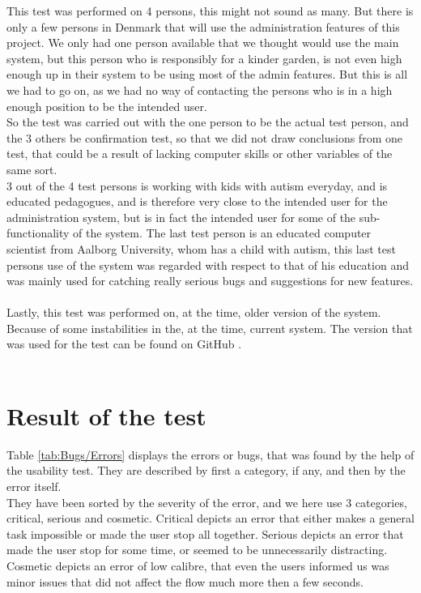 This test was performed on 4 persons, this might not sound as many. But there is only a few persons in Denmark that will use the administration features of this project. We only had one person available that we thought would use the main system, but this person who is responsibly for a kinder garden, is not even high enough up in their system to be using most of the admin features. But this is all we had to go on, as we had no way of contacting the persons who is in a high enough position to be the intended user.\\
So the test was carried out with the one person to be the actual test person, and the 3 others be confirmation test, so that we did not draw conclusions from one test, that could be a result of lacking computer skills or other variables of the same sort.\\
3 out of the 4 test persons is working with kids with autism everyday, and is educated pedagogues, and is therefore very close to the intended user for the administration system, but is in fact the intended user for some of the sub-functionality of the system. The last test person is an educated computer scientist from Aalborg University, whom has a child with autism, this last test persons use of the system was regarded with respect to that of his education and was mainly used for catching really serious bugs and suggestions for new features.\\
\\

Lastly, this test was performed on, at the time, older version of the system. Because of some instabilities in the, at the time, current system. The version that was used for the test can be found on GitHub \citep{testBranch}.\\
\\

\section{Result of the test}
Table \ref{tab:Bugs/Errors} displays the errors or bugs, that was found by the help of the usability test. They are described by first a category, if any, and then by the error itself.\\
They have been sorted by the severity of the error, and we here use 3 categories, critical, serious and cosmetic. Critical depicts an error that either makes a general task impossible or made the user stop all together. Serious depicts an error that made the user stop for some time, or seemed to be unnecessarily distracting. Cosmetic depicts an error of low calibre, that even the users informed us was minor issues that did not affect the flow much more then a few seconds.\\
\\

